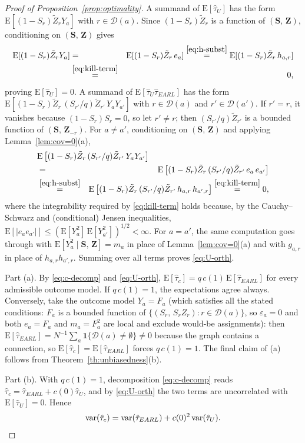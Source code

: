 \documentclass[sigconf]{acmart}
\newcommand{\E}{\mathrm E}
\DeclareMathOperator{\var}{var}
\begin{document}
\begin{proof}[Proof of Proposition~\ref{prop:optimality}]
    A summand of $\E[\hat\tau_U]$ has the form $\E[(1-S_r)\tilde Z_rY_a]$ with $r\in\mathcal D(a)$. Since $(1-S_r)\tilde Z_r$ is a function of $(\mathbf S,\,\mathbf Z)$, conditioning on $(\mathbf S,\,\mathbf Z)$ gives
    \begin{eqnarray*}
        \E[(1-S_r)\tilde Z_rY_a] &=& \E[(1-S_r)\tilde Z_r\,e_a]
        \stackrel{\eqref{eq:h-subst}}{=} \E[(1-S_r)\tilde Z_r\,h_{a,r}]\\
        &\stackrel{\eqref{eq:kill-term}}{=}& 0,
    \end{eqnarray*}
    proving $\E[\hat\tau_U]=0$. A summand of $\E[\hat\tau_U\hat\tau_{EARL}]$ has the form $\E[(1-S_r)\tilde Z_r\, (S_{r'}/q)\tilde Z_{r'}\, Y_aY_{a'}]$ with $r\in\mathcal D(a)$ and $r'\in\mathcal D(a')$. If $r'=r$, it vanishes because $(1-S_r)S_r=0$, so let $r'\neq r$; then $(S_{r'}/q)\tilde Z_{r'}$ is a bounded function of $(\mathbf S,\,\mathbf Z_{-r})$. For $a\neq a'$, conditioning on $(\mathbf S,\,\mathbf Z)$ and applying Lemma~\ref{lem:cov=0}(a),
    \begin{eqnarray*}
        \lefteqn{\E\left[(1-S_r)\tilde Z_r\, (S_{r'}/q)\tilde Z_{r'}\, Y_aY_{a'}\right]}\\
        &=& \E\left[(1-S_r)\tilde Z_r\, (S_{r'}/q)\tilde Z_{r'}\, e_a\,e_{a'}\right]\\
        &\stackrel{\eqref{eq:h-subst}}{=}& \E\left[(1-S_r)\tilde Z_r\, (S_{r'}/q)\tilde Z_{r'}\, h_{a,r}\,h_{a',r}\right]
        \stackrel{\eqref{eq:kill-term}}{=} 0,
    \end{eqnarray*}
    where the integrability required by \eqref{eq:kill-term} holds because, by the Cauchy--Schwarz and (conditional) Jensen inequalities, $\E[|e_ae_{a'}|]\le(\E[Y_a^2]\,\E[Y_{a'}^2])^{1/2}<\infty$. For $a=a'$, the same computation goes through with $\E[Y_a^2\mid\mathbf S,\,\mathbf Z]=m_a$ in place of Lemma~\ref{lem:cov=0}(a) and with $g_{a,r}$ in place of $h_{a,r}h_{a',r}$. Summing over all terms proves \eqref{eq:U-orth}.

    Part (a). By \eqref{eq:c-decomp} and \eqref{eq:U-orth}, $\E[\hat\tau_c] = q\,c(1)\,\E[\hat\tau_{EARL}]$ for every admissible outcome model. If $q\,c(1)=1$, the expectations agree always. Conversely, take the outcome model $Y_a = F_a$ (which satisfies all the stated conditions: $F_a$ is a bounded function of $\{(S_r,\,S_rZ_r)\colon r\in\mathcal D(a)\}$, so $\varepsilon_a=0$ and both $e_a=F_a$ and $m_a=F_a^2$ are local and exclude would-be assignments): then $\E[\hat\tau_{EARL}] = N^{-1}\sum_a \mathbf 1\{\mathcal D(a)\neq\emptyset\}\neq 0$ because the graph contains a connection, so $\E[\hat\tau_c]=\E[\hat\tau_{EARL}]$ forces $q\,c(1)=1$. The final claim of (a) follows from Theorem~\ref{th:unbiasedness}(b).

    Part (b). With $q\,c(1)=1$, decomposition \eqref{eq:c-decomp} reads $\hat\tau_c = \hat\tau_{EARL} + c(0)\hat\tau_U$, and by \eqref{eq:U-orth} the two terms are uncorrelated with $\E[\hat\tau_U]=0$. Hence
    \begin{equation*}
        \var(\hat\tau_c) = \var(\hat\tau_{EARL}) + c(0)^2\var(\hat\tau_U). \qedhere
    \end{equation*}
\end{proof}
\end{document}
